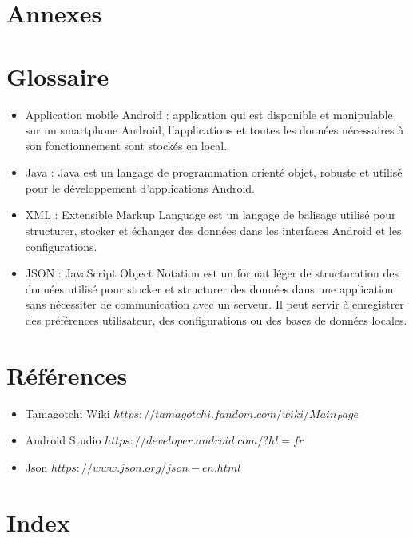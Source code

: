\documentclass{rapportECL}
\begin{document}
\section{Annexes}

\section{Glossaire}
\begin{itemize}[label=\textbullet]
\item Application mobile Android : application qui est disponible et manipulable sur un smartphone Android, l’applications et toutes les données nécessaires à son fonctionnement sont stockés en local.
\item Java : Java est un langage de programmation orienté objet, robuste et utilisé pour le développement d'applications Android.
\item XML : Extensible Markup Language est un langage de balisage utilisé pour structurer, stocker et échanger des données dans les interfaces Android et les configurations.
\item JSON : JavaScript Object Notation est un format léger de structuration des données utilisé pour stocker et structurer des données dans une application sans nécessiter de communication avec un serveur. Il peut servir à enregistrer des préférences utilisateur, des configurations ou des bases de données locales.
\end{itemize}

\section{Références}
\begin{itemize}[label=\textbullet]
\item Tamagotchi Wiki \href{https://tamagotchi.fandom.com/wiki/Main_Page}{$https://tamagotchi.fandom.com/wiki/Main_Page$}
\item Android Studio \href{https://developer.android.com/?hl=fr}{$https://developer.android.com/?hl=fr$}
\item Json \href{https://www.json.org/json-en.html}{$https://www.json.org/json-en.html$}
\end{itemize}

\section{Index}

\end{document}

